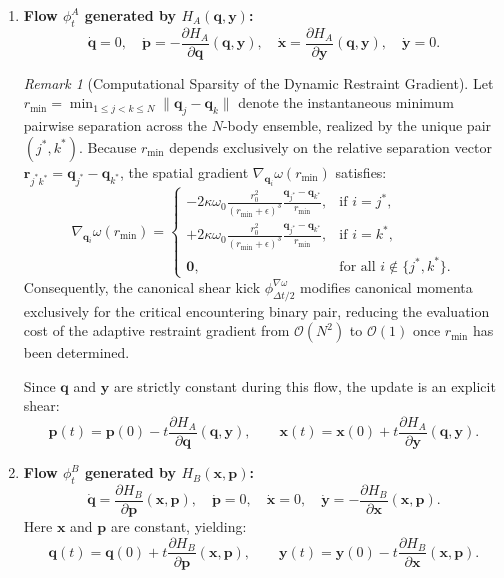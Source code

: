 \documentclass[11pt,a4paper,reqno]{article}
\theoremstyle{plain}
\theoremstyle{definition}
\theoremstyle{remark}
\newtheorem{remark}[theorem]{Remark}
\numberwithin{equation}{section}
\begin{document}
\begin{enumerate}
    \item \textbf{Flow $\phi_t^A$ generated by $H_A(\bm{q}, \bm{y})$:}
    \begin{equation}
    \dot{\bm{q}} = 0, \quad \dot{\bm{p}} = -\frac{\partial H_A}{\partial \bm{q}}(\bm{q}, \bm{y}), \quad \dot{\bm{x}} = \frac{\partial H_A}{\partial \bm{y}}(\bm{q}, \bm{y}), \quad \dot{\bm{y}} = 0.
    \end{equation}
\begin{remark}[Computational Sparsity of the Dynamic Restraint Gradient]
Let $r_{\min} = \min_{1 \le j < k \le N} \|\bm{q}_j - \bm{q}_k\|$ denote the instantaneous minimum pairwise separation across the $N$-body ensemble, realized by the unique pair $(j^*, k^*)$. Because $r_{\min}$ depends exclusively on the relative separation vector $\bm{r}_{j^* k^*} = \bm{q}_{j^*} - \bm{q}_{k^*}$, the spatial gradient $\nabla_{\bm{q}_i}\omega(r_{\min})$ satisfies:
\begin{equation}
\label{eq:omega_grad_sparsity}
\nabla_{\bm{q}_i} \omega(r_{\min}) = \begin{cases}
-2\kappa \omega_0 \frac{r_0^2}{(r_{\min} + \epsilon)^3} \frac{\bm{q}_{j^*} - \bm{q}_{k^*}}{r_{\min}}, & \text{if } i = j^*, \\[6pt]
+2\kappa \omega_0 \frac{r_0^2}{(r_{\min} + \epsilon)^3} \frac{\bm{q}_{j^*} - \bm{q}_{k^*}}{r_{\min}}, & \text{if } i = k^*, \\[6pt]
\bm{0}, & \text{for all } i \notin \{j^*, k^*\}.
\end{cases}
\end{equation}
Consequently, the canonical shear kick $\phi^{\nabla\omega}_{\Delta t/2}$ modifies canonical momenta exclusively for the critical encountering binary pair, reducing the evaluation cost of the adaptive restraint gradient from $\mathcal{O}(N^2)$ to $\mathcal{O}(1)$ once $r_{\min}$ has been determined.
\end{remark}
    Since $\bm{q}$ and $\bm{y}$ are strictly constant during this flow, the update is an explicit shear:
    \begin{equation}
    \bm{p}(t) = \bm{p}(0) - t \frac{\partial H_A}{\partial \bm{q}}(\bm{q}, \bm{y}), \qquad \bm{x}(t) = \bm{x}(0) + t \frac{\partial H_A}{\partial \bm{y}}(\bm{q}, \bm{y}).
    \end{equation}

    \item \textbf{Flow $\phi_t^B$ generated by $H_B(\bm{x}, \bm{p})$:}
    \begin{equation}
    \dot{\bm{q}} = \frac{\partial H_B}{\partial \bm{p}}(\bm{x}, \bm{p}), \quad \dot{\bm{p}} = 0, \quad \dot{\bm{x}} = 0, \quad \dot{\bm{y}} = -\frac{\partial H_B}{\partial \bm{x}}(\bm{x}, \bm{p}).
    \end{equation}
    Here $\bm{x}$ and $\bm{p}$ are constant, yielding:
    \begin{equation}
    \bm{q}(t) = \bm{q}(0) + t \frac{\partial H_B}{\partial \bm{p}}(\bm{x}, \bm{p}), \qquad \bm{y}(t) = \bm{y}(0) - t \frac{\partial H_B}{\partial \bm{x}}(\bm{x}, \bm{p}).
    \end{equation}


\end{enumerate}
\end{document}
